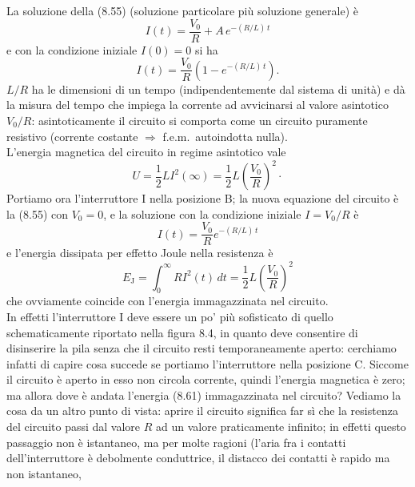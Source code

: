 La soluzione della (8.55) (soluzione particolare pi\`u soluzione generale) \`e
\begin{equation}
  I(t)=\frac{V_0}{R}+A\,e^{-(R/L)\,t}
  \tag{8.59}
\end{equation}
e con la condizione iniziale $I(0)=0$ si ha
\begin{equation}
  I(t)=\frac{V_0}{R}\left(1-e^{-(R/L)\,t}\right).
  \tag{8.60}
\end{equation}
$L/R$ ha le dimensioni di un tempo (indipendentemente dal sistema di unit\`a) e
d\`a la misura del tempo che impiega la corrente ad avvicinarsi al valore
asintotico $V_0/R$: asintoticamente il circuito si comporta come un circuito
puramente resistivo (corrente costante $\Rightarrow$ f.e.m.\ autoindotta
nulla).\\
L'energia magnetica del circuito in regime asintotico vale
\begin{equation}
  U=\frac{1}{2}LI^2(\infty)=\frac{1}{2}L\left(\frac{V_0}{R}\right)^2\cdot
  \tag{8.61}
\end{equation}
Portiamo ora l'interruttore I nella posizione B; la nuova equazione del circuito
\`e la (8.55) con $V_0=0$, e la soluzione con la condizione iniziale $I=V_0/R$
\`e
\begin{equation}
  I(t)=\frac{V_0}{R}e^{-(R/L)\,t}
  \tag{8.62}
\end{equation}
e l'energia dissipata per effetto Joule nella resistenza \`e
\begin{equation}
  E_\mathrm{J}=\int_0^\infty RI^2(t)\,dt
  =\frac{1}{2}L\left(\frac{V_0}{R}\right)^2
  \tag{8.63}
\end{equation}
che ovviamente coincide con l'energia immagazzinata nel circuito.\\
In effetti l'interruttore I deve essere un po' pi\`u sofisticato di quello
schematicamente riportato nella figura 8.4, in quanto deve consentire di
disinserire la pila senza che il circuito resti temporaneamente aperto:
cerchiamo infatti di capire cosa succede se portiamo l'interruttore nella
posizione C. Siccome il circuito \`e aperto in esso non circola corrente, quindi
l'energia magnetica \`e zero; ma allora dove \`e andata l'energia (8.61)
immagazzinata nel circuito? Vediamo la cosa da un altro punto di vista: aprire
il circuito significa far s\`i che la resistenza del circuito passi dal valore
$R$ ad un valore praticamente infinito; in effetti questo passaggio non \`e
istantaneo, ma per molte ragioni (l'aria fra i contatti dell'interruttore \`e
debolmente conduttrice, il distacco dei contatti \`e rapido ma non istantaneo,
